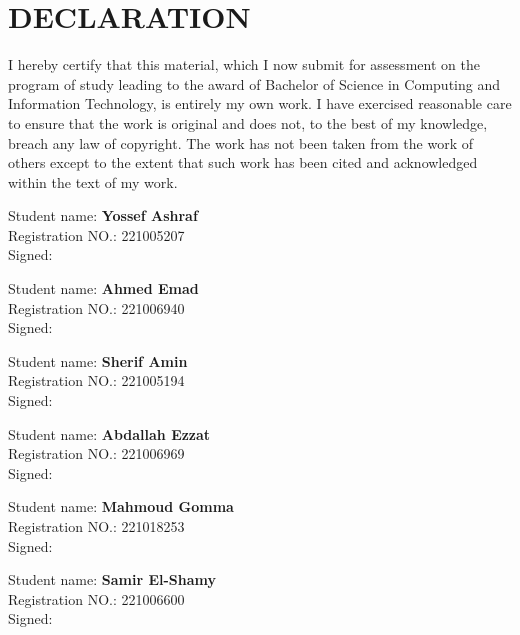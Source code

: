 \chapter*{DECLARATION}
\thispagestyle{plain}

\vspace{0.5cm}

I hereby certify that this material, which I now submit for assessment on the program of study
leading to the award of Bachelor of Science in Computing and Information Technology, is entirely
my own work. I have exercised reasonable care to ensure that the work is original and does not,
to the best of my knowledge, breach any law of copyright. The work has not been taken from the
work of others except to the extent that such work has been cited and acknowledged within the
text of my work.

\vspace{1.5cm}

\newcommand{\studentblock}[2]{%
  \begin{minipage}[t]{0.48\textwidth}
  Student name: \textbf{#1}\\[6pt]
  Registration NO.: #2\\[6pt]
  Signed: \underline{\hspace{3.5cm}}
  \end{minipage}}

\noindent
\studentblock{Yossef Ashraf}{221005207}\hfill
\studentblock{Ahmed Emad}{221006940}

\vspace{1.1cm}

\noindent
\studentblock{Sherif Amin}{221005194}\hfill
\studentblock{Abdallah Ezzat}{221006969}

\vspace{1.1cm}

\noindent
\studentblock{Mahmoud Gomma}{221018253}\hfill
\studentblock{Samir El-Shamy}{221006600}

\vspace{1.5cm}

\clearpage

